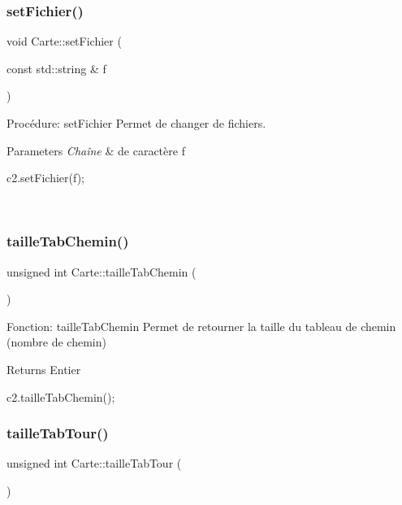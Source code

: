 \subsubsection{\texorpdfstring{set\+Fichier()}{setFichier()}}
{\footnotesize\ttfamily void Carte\+::set\+Fichier (\begin{DoxyParamCaption}\item[{const std\+::string \&}]{f }\end{DoxyParamCaption})}



Procédure\+: set\+Fichier Permet de changer de fichiers. 


\begin{DoxyParams}{Parameters}
{\em Chaîne} & de caractère f 
\begin{DoxyCode}
c2.setFichier(f);
\end{DoxyCode}
 \\
\hline
\end{DoxyParams}
\mbox{\label{classCarte_aa55a81ad0d51af69b0a34dcc544b678d}} 
\subsubsection{\texorpdfstring{taille\+Tab\+Chemin()}{tailleTabChemin()}}
{\footnotesize\ttfamily unsigned int Carte\+::taille\+Tab\+Chemin (\begin{DoxyParamCaption}{ }\end{DoxyParamCaption})}



Fonction\+: taille\+Tab\+Chemin Permet de retourner la taille du tableau de chemin (nombre de chemin) 

\begin{DoxyReturn}{Returns}
Entier 
\begin{DoxyCode}
c2.tailleTabChemin();
\end{DoxyCode}
 
\end{DoxyReturn}
\mbox{\label{classCarte_a34264cb9ab59c19b9bd7ad1eeae324b0}} 
\subsubsection{\texorpdfstring{taille\+Tab\+Tour()}{tailleTabTour()}}
{\footnotesize\ttfamily unsigned int Carte\+::taille\+Tab\+Tour (\begin{DoxyParamCaption}{ }\end{DoxyParamCaption})}



